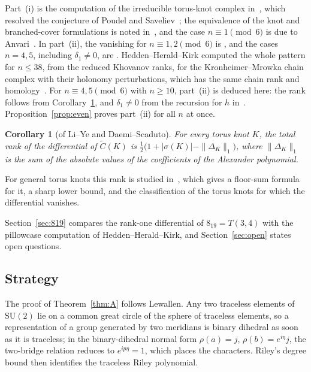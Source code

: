 \documentclass[11pt,reqno]{amsart}
\theoremstyle{plain}
\newtheorem{corollary}[theorem]{Corollary}
\theoremstyle{definition}
\newcommand{\SU}{\mathrm{SU}(2)}
\begin{document}
Part~(i) is the computation of the irreducible torus-knot complex in~\cite[Cor.~3]{DScaduto}, which
resolved the conjecture of Poudel and Saveliev~\cite[\S7.4]{PS}; the equivalence of the knot and
branched-cover formulations is noted in~\cite[\S9.5]{DSEquiv}, and the case $n\equiv1\pmod 6$ is due to
Anvari~\cite[Ex.~6.2]{Anvari}. In part~(ii), the vanishing for $n\equiv1,2\pmod6$ is
\cite[(9.36), Prop.~9.37]{DSEquiv}, and the cases $n=4,5$, including $\delta_1\neq0$, are
\cite[\S\S9.3--9.4]{DSEquiv}. Hedden--Herald--Kirk computed the whole pattern for $n\le38$, from the reduced Khovanov ranks, for the
Kronheimer--Mrowka chain complex with their holonomy perturbations, which has the same chain rank and
homology~\cite[\S12.4]{HHK1}. For $n\equiv4,5\pmod6$ with $n\ge10$, part~(ii) is deduced here: the rank
follows from Corollary~\ref{cor:torus}, and $\delta_1\neq0$ from the recursion for $h$
in~\cite[Prop.~6.11]{DScaduto}. Proposition~\ref{prop:even} proves part~(ii) for all $n$ at once.

\begin{corollary}[of Li--Ye and Daemi--Scaduto]\label{cor:torus}
For every torus knot $K$, the total rank of the differential of $\widetilde C(K)$ is
$\tfrac12\bigl(1+|\sigma(K)|-\|\Delta_K\|_1\bigr)$, where $\|\Delta_K\|_1$ is the sum of the absolute
values of the coefficients of the Alexander polynomial.
\end{corollary}

For general torus knots this rank is studied in~\cite{WuebbenIV}, which gives a floor-sum formula for it, a sharp
lower bound, and the classification of the torus knots for which the differential vanishes.

Section~\ref{sec:819} compares the rank-one differential of $8_{19}=T(3,4)$ with the pillowcase computation
of Hedden--Herald--Kirk, and Section~\ref{sec:open} states open questions.

\subsection{Strategy}
The proof of Theorem~\ref{thm:A} follows Lewallen. Any two traceless elements of $\SU$ lie on a common
great circle of the sphere of traceless elements, so a representation of a group generated by two
meridians is binary dihedral as soon as it is traceless; in the binary-dihedral normal form $\rho(a)=j$,
$\rho(b)=e^{i\eta}j$, the two-bridge relation reduces to $e^{ip\eta}=1$, which places the characters. Riley's degree bound then identifies
the traceless Riley polynomial.
\end{document}
